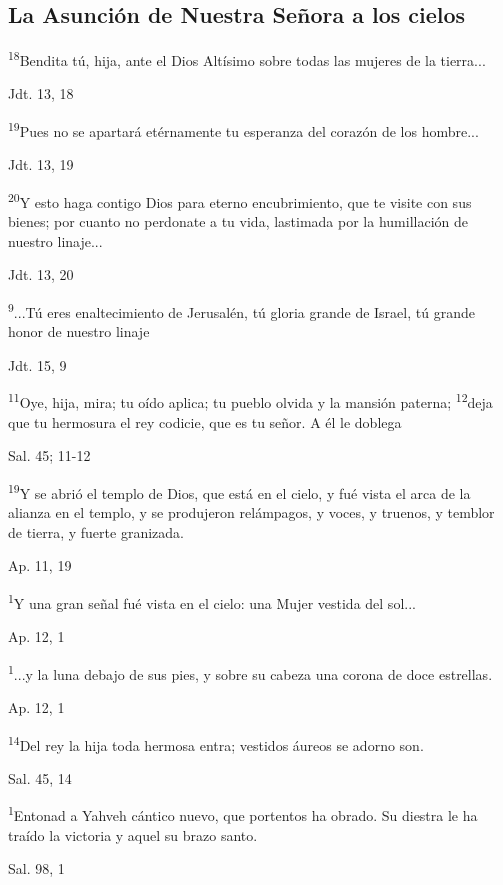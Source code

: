 \documentclass[a4paper,11pt]{article}
\begin{document}
    \subsection*{\hfil La Asunción de Nuestra Señora a los cielos \hfil}
      \textsuperscript{18}Bendita tú, hija, ante el Dios Altísimo sobre todas las mujeres de la tierra...
      \begin{flushright}
        Jdt. 13, 18
      \end{flushright}      
      \textsuperscript{19}Pues no se apartará etérnamente tu esperanza del corazón de los hombre...
      \begin{flushright}
        Jdt. 13, 19
      \end{flushright}
      \textsuperscript{20}Y esto haga contigo Dios para eterno encubrimiento, que te visite con sus bienes; por cuanto no perdonate
      a tu vida, lastimada por la humillación de nuestro linaje...
      \begin{flushright}
        Jdt. 13, 20
      \end{flushright}      
      \textsuperscript{9}...Tú eres enaltecimiento de Jerusalén, tú gloria grande de Israel, tú grande honor de nuestro linaje
      \begin{flushright}
        Jdt. 15, 9
      \end{flushright}      
      \textsuperscript{11}Oye, hija, mira; tu oído aplica; tu pueblo olvida y la mansión paterna; \textsuperscript{12}deja que tu hermosura
      el rey codicie, que es tu señor. A él le doblega
      \begin{flushright}
        Sal. 45; 11-12
      \end{flushright}      
      \textsuperscript{19}Y se abrió el templo de Dios, que está en el cielo, y fué vista el arca de la alianza en el templo,
      y se produjeron relámpagos, y voces, y truenos, y temblor de tierra, y fuerte granizada.
      \begin{flushright}
        Ap. 11, 19
      \end{flushright}      
      \textsuperscript{1}Y una gran señal fué vista en el cielo: una Mujer vestida del sol...
      \begin{flushright}
        Ap. 12, 1
      \end{flushright}      
      \textsuperscript{1}...y la luna debajo de sus pies, y sobre su cabeza una corona de doce estrellas.
      \begin{flushright}
        Ap. 12, 1
      \end{flushright}      
      \textsuperscript{14}Del rey la hija toda hermosa entra; vestidos áureos se adorno son.
      \begin{flushright}
        Sal. 45, 14
      \end{flushright}      
      \textsuperscript{1}Entonad a Yahveh cántico nuevo, que portentos ha obrado. Su diestra le ha traído la victoria y aquel su brazo santo.
      \begin{flushright}
        Sal. 98, 1
      \end{flushright}
\end{document}
